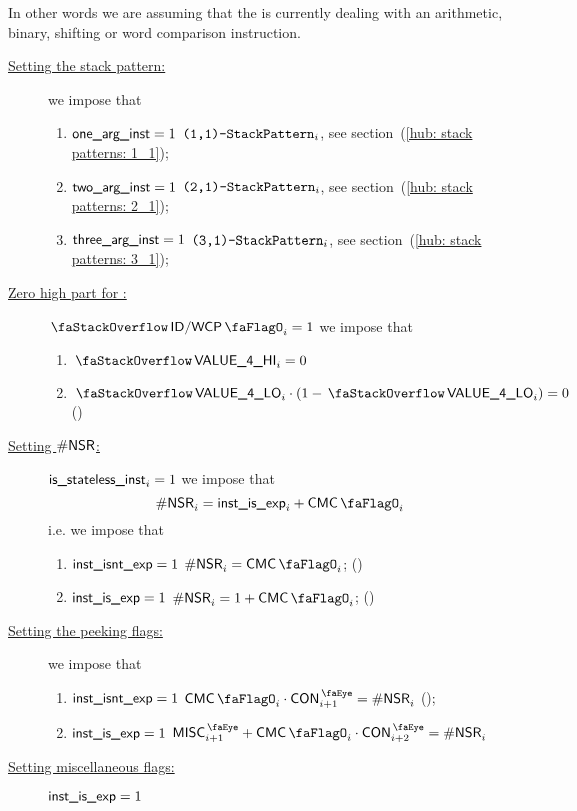 In other words we are assuming that the \zkEvm{} is currently dealing with an arithmetic, binary, shifting or word comparison instruction.
\begin{description}
	\item[\underline{Setting the stack pattern:}] we impose that
		\begin{enumerate}
			\item \If $\textsf{one\_arg\_inst} = 1$ \Then $\texttt{(1,1)-}\texttt{StackPattern}_{i}$,   see section~(\ref{hub: stack patterns: 1_1});
			\item \If $\textsf{two\_arg\_inst} = 1$ \Then $\texttt{(2,1)-}\texttt{StackPattern}_{i}$,   see section~(\ref{hub: stack patterns: 2_1});
			\item \If $\textsf{three\_arg\_inst} = 1$ \Then $\texttt{(3,1)-}\texttt{StackPattern}_{i}$, see section~(\ref{hub: stack patterns: 3_1});
		\end{enumerate}
	\item[\underline{Zero high part for \wcpMod{}:}]\label{hub: instruction handling: stateless: wcp high part is zero}
		\If $\stackDecWcpFlag_{i} = 1$ \Then we impose that
		\begin{enumerate}
			\item $\stackItemValHi{4}_{i} = 0$
			\item $\stackItemValLo{4}_{i} \cdot (1 - \stackItemValLo{4}_{i}) = 0$ \quad (\trash)
		\end{enumerate}
	\item[\underline{Setting $\textsf{\#NSR}$:}] \If $\textsf{is\_stateless\_inst}_{i} = 1$ \Then we impose that
		\[
			\nonStackRows_{i} = \instIsExp_{i} + \cmc_{i}
		\]
		i.e. we impose that
		\begin{enumerate}
			\item \If $\textsf{inst\_isnt\_exp} = 1$ \Then $\nonStackRows_{i} = \cmc_{i}$; \quad (\trash)
			\item \If $\textsf{inst\_is\_exp}   = 1$ \Then $\nonStackRows_{i} = 1 + \cmc_{i}$; \quad (\trash)
		\end{enumerate}
	\item[\underline{Setting the peeking flags:}] we impose that
		\begin{enumerate}
			\item \If $\textsf{inst\_isnt\_exp} = 1$ \Then $\cmc_{i} \cdot \peekContext_{i + 1} = \nonStackRows_{i}$ (\trash);
			\item \If $\textsf{inst\_is\_exp}   = 1$ \Then $ \peekMisc_{i + 1} + \cmc_{i} \cdot \peekContext_{i + 2} = \nonStackRows_{i} $
		\end{enumerate}
	\item[\underline{Setting miscellaneous flags:}] \If $\textsf{inst\_is\_exp} = 1$ \Then

\end{description}
